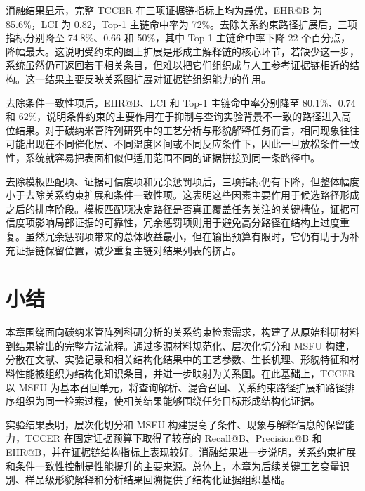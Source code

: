 消融结果显示，完整 TCCER 在三项证据链指标上均为最优，EHR@B 为 85.6\%，LCI 为 0.82，Top-1 主链命中率为 72\%。去除关系约束路径扩展后，三项指标分别降至 74.8\%、0.66 和 50\%，其中 Top-1 主链命中率下降 22 个百分点，降幅最大。这说明受约束的图上扩展是形成主解释链的核心环节，若缺少这一步，系统虽然仍可返回若干相关条目，但难以把它们组织成与人工参考证据链相近的结构。这一结果主要反映关系图扩展对证据链组织能力的作用。

去除条件一致性项后，EHR@B、LCI 和 Top-1 主链命中率分别降至 80.1\%、0.74 和 62\%，说明条件约束的主要作用在于抑制与查询实验背景不一致的路径进入高位结果。对于碳纳米管阵列研究中的工艺分析与形貌解释任务而言，相同现象往往可能出现在不同催化层、不同温度区间或不同反应条件下，因此一旦放松条件一致性，系统就容易把表面相似但适用范围不同的证据拼接到同一条路径中。

去除模板匹配项、证据可信度项和冗余惩罚项后，三项指标仍有下降，但整体幅度小于去除关系约束扩展和条件一致性项。这表明这些因素主要作用于候选路径形成之后的排序阶段。模板匹配项决定路径是否真正覆盖任务关注的关键槽位，证据可信度项影响局部证据的可靠性，冗余惩罚项则用于避免高分路径在结构上过度重复。虽然冗余惩罚项带来的总体收益最小，但在输出预算有限时，它仍有助于为补充证据链保留位置，减少重复主链对结果列表的挤占。

\section{小结}

本章围绕面向碳纳米管阵列科研分析的关系约束检索需求，构建了从原始科研材料到结果输出的完整方法流程。通过多源材料规范化、层次化切分和 MSFU 构建，分散在文献、实验记录和相关结构化结果中的工艺参数、生长机理、形貌特征和材料性能被组织为结构化知识条目，并进一步映射为关系图。在此基础上，TCCER 以 MSFU 为基本召回单元，将查询解析、混合召回、关系约束路径扩展和路径排序组织为同一检索过程，使相关结果能够围绕任务目标形成结构化证据。

实验结果表明，层次化切分和 MSFU 构建提高了条件、现象与解释信息的保留能力，TCCER 在固定证据预算下取得了较高的 Recall@B、Precision@B 和 EHR@B，并在证据链结构指标上表现较好。消融结果进一步说明，关系约束扩展和条件一致性控制是性能提升的主要来源。总体上，本章为后续关键工艺变量识别、样品级形貌解释和分析结果回溯提供了结构化证据组织基础。
